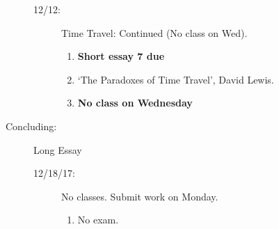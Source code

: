 \documentclass[article,oneside]{memoir}
\begin{document}
\begin{description}
\begin{description}
\item[12/12:] Time Travel: Continued (No class on Wed).
\begin{enumerate}
\item \textbf{Short essay 7 due}
\item `The Paradoxes of Time Travel', David Lewis.
\item \textbf{No class on Wednesday}
\end{enumerate}

\end{description}

\item[Concluding:] Long Essay
\begin{description}
\item[12/18/17:] No classes. Submit work on Monday.
\begin{enumerate}
\item No exam.

\end{enumerate}
\end{description}
\end{description} 



\end{document}
